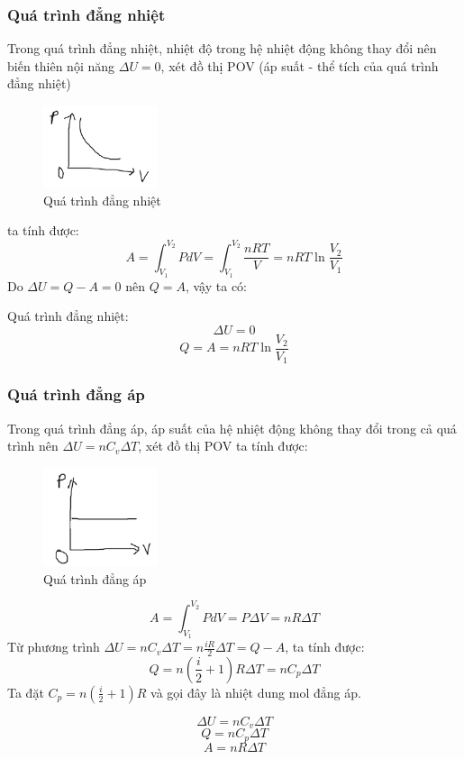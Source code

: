 \subsubsection{Quá trình đẳng nhiệt}
Trong quá trình đẳng nhiệt, nhiệt độ trong hệ nhiệt động không thay đổi nên biến thiên nội năng $\Delta U=0$, xét đồ thị POV (áp suất - thể tích của quá trình đẳng nhiệt)
\begin{figure}
    \centering
    \includegraphics[width=0.3\textwidth]{dang_nhiet.png}
    \caption{Quá trình đẳng nhiệt}
    \label{dang_nhiet}
\end{figure}
ta tính được:
$$A=\int_{V_{1}}^{V_{2}}PdV=\int_{V_{1}}^{V_{2}}\frac{nRT}{V}=nRT \ln{\frac{V_{2}}{V_{1}}}$$
Do $\Delta U=Q-A=0$ nên $Q=A$, vậy ta có:
\begin{tcolorbox}
    Quá trình đẳng nhiệt:
    $$\Delta U=0$$
    $$Q=A=nRT\ln{\frac{V_{2}}{V_{1}}}$$
\end{tcolorbox}
\subsubsection{Quá trình đẳng áp}
Trong quá trình đẳng áp, áp suất của hệ nhiệt động không thay đổi trong cả quá trình nên $\Delta U=nC_{v}\Delta T$, xét đồ thị POV ta tính được:
\begin{figure}
    \centering
    \includegraphics[width=0.3\textwidth]{dang_ap.png}
    \caption{Quá trình đẳng áp}
    \label{dang_ap}
\end{figure}
$$A=\int_{V_{1}}^{V_{2}}PdV=P\Delta V=nR\Delta T$$
Từ phương trình $\Delta U=nC_{v}\Delta T=n\frac{iR}{2}\Delta T=Q-A$, ta tính được:
$$Q=n(\frac{i}{2}+1)R\Delta T=nC_{p}\Delta T$$ Ta đặt $C_{p}=n(\frac{i}{2}+1)R$ và gọi đây là nhiệt dung mol đẳng áp.
\begin{tcolorbox}
    $$\Delta U=nC_{v}\Delta T$$
    $$Q=nC_{p}\Delta T$$
    $$A=nR\Delta T$$
\end{tcolorbox}
